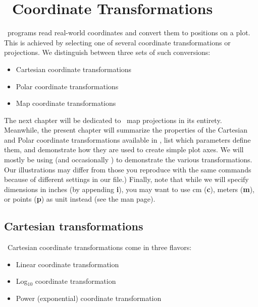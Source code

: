 %
%
\chapter{\gmt\ Coordinate Transformations}
\label{ch:5}
\thispagestyle{headings}

\GMT\ programs read real-world coordinates and convert them to positions on a plot.
This is achieved by selecting one of several coordinate transformations or projections.
We distinguish between three sets of such conversions:

\begin{itemize}
\item Cartesian coordinate transformations
\item Polar coordinate transformations
\item Map coordinate transformations
\end{itemize}

The next chapter will be dedicated to \GMT\ map projections in its entirety.  Meanwhile, the present chapter
will summarize the properties of the Cartesian and Polar coordinate transformations available in \GMT, list
which parameters define them, and demonstrate how they are used to create simple plot axes.  We will mostly
be using  (and occasionally ) to demonstrate the various transformations.
Our illustrations may differ from those you reproduce with the same commands because of different settings
in our  file.)  Finally, note that while we will specify dimensions in inches (by
appending {\bf i}), you may want to use cm ({\bf c}), meters ({\bf m}), or points ({\bf p}) as unit instead
(see the  man page). 

\section{Cartesian transformations}

\GMT\ Cartesian coordinate transformations come in three flavors:

\begin{itemize}
\item Linear coordinate transformation
\item Log$_{10}$ coordinate transformation
\item Power (exponential) coordinate transformation
\end{itemize}

